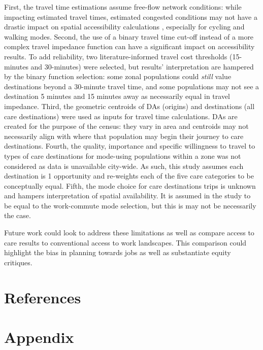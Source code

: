 \documentclass[
  authoryear,
  preprint,
  3p]{elsarticle}
\begin{document}
First, the travel time estimations assume free-flow network conditions:
while impacting estimated travel times, estimated congested conditions
may not have a drastic impact on spatial accessibility calculations
\citep{yiannakouliasEstimatingEffectTurn2013}, especially for cycling
and walking modes. Second, the use of a binary travel time cut-off
instead of a more complex travel impedance function can have a
significant impact on accessibility results. To add reliability, two
literature-informed travel cost thresholds (15-minutes and 30-minutes)
were selected, but results' interpretation are hampered by the binary
function selection: some zonal populations could \emph{still} value
destinations beyond a 30-minute travel time, and some populations may
not see a destination 5 minutes and 15 minutes away as necessarily equal
in travel impedance. Third, the geometric centroids of DAs (origins) and
destinations (all care destinations) were used as inputs for travel time
calculations. DAs are created for the purpose of the census: they vary
in area and centroids may not necessarily align with where that
population may begin their journey to care destinations. Fourth, the
quality, importance and specific willingness to travel to types of care
destinations for mode-using populations within a zone was not considered
as data is unavailable city-wide. As such, this study assumes each
destination is 1 opportunity and re-weights each of the five care
categories to be conceptually equal. Fifth, the mode choice for care
destinations trips is unknown and hampers interpretation of spatial
availability. It is assumed in the study to be equal to the work-commute
mode selection, but this is may not be necessarily the case.

Future work could look to address these limitations as well as compare
access to care results to conventional access to work landscapes. This
comparison could highlight the bias in planning towards jobs as well as
substantiate equity critiques.

\hypertarget{references}{%
\section*{References}\label{references}}

\hypertarget{appendix}{%
\section{Appendix}\label{appendix}}


  
\end{document}
